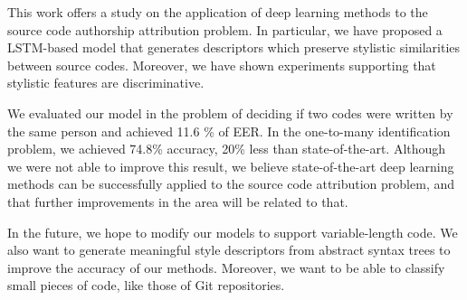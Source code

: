 
This work offers a study on the application of deep learning methods to the source code authorship attribution problem. In particular, we have proposed a LSTM-based model that generates descriptors which preserve stylistic similarities between source codes. Moreover, we have shown experiments supporting that stylistic features are discriminative. 

We evaluated our model in the problem of deciding if two codes were written by the same person and achieved 11.6 \% of EER. In the one-to-many identification problem, we achieved 74.8\% accuracy, 20\% less than state-of-the-art. Although we were not able to improve this result, we believe state-of-the-art deep learning methods can be successfully applied to the source code attribution problem, and that further improvements in the area will be related to that.

In the future, we hope to modify our models to support variable-length code. We also want to generate meaningful style descriptors from abstract syntax trees to improve the accuracy of our methods. Moreover, we want to be able to classify small pieces of code, like those of Git repositories.